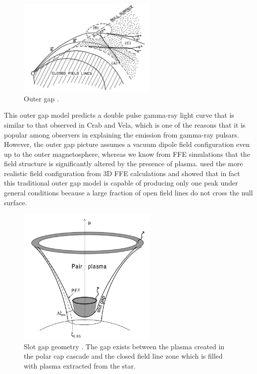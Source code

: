 \begin{figure}[h]
  \centering
  \includegraphics[width=0.6\textwidth]{pics/intro/outer-gap.png}
  \caption[Outer gap]{Outer gap \citet{cheng_energetic_1986}.}
  \label{fig:outer-gap}
\end{figure}

This outer gap model predicts a double pulse gamma-ray light curve that is
similar to that observed in Crab and Vela, which is one of the reasons that it
is popular among observers in explaining the emission from gamma-ray pulsars.
However, the outer gap picture assumes a vacuum dipole field configuration even
up to the outer magnetosphere, whereas we know from FFE simulations that the
field structure is significantly altered by the presence of plasma.
\citet{bai_modeling_2010} used the more realistic field configuration from 3D
FFE calculations and showed that in fact this traditional outer gap model is
capable of producing only one peak under general conditions because a large
fraction of open field lines do not cross the null surface.

\begin{figure}[h]
  \centering
  \includegraphics[width=0.6\textwidth]{pics/intro/slot-gap2.png}
  \caption[Slot gap geometry.]{Slot gap geometry \citep{muslimov_extended_2003}.
  The gap exists between the plasma created in the polar cap cascade and the
  closed field line zone which is filled with plasma extracted from the star.}
  \label{fig:slot-gap}
\end{figure}

